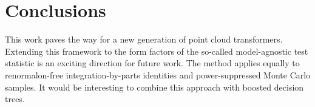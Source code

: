 \section{Conclusions}\label{sec:conclusions}

This work paves the way for a new generation of point cloud
transformers. Extending this framework to the form factors of the
so-called model-agnostic test statistic is an exciting direction for
future work. The method applies equally to renormalon-free
integration-by-parts identities and power-suppressed Monte Carlo
samples. It would be interesting to combine this approach with boosted
decision trees.

